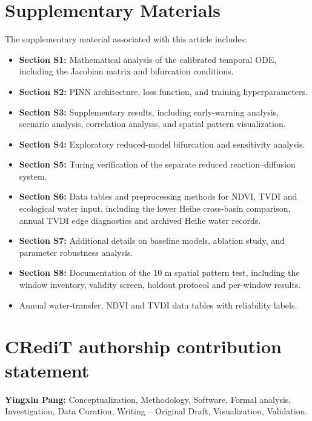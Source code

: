 \documentclass[preprint,review,12pt,3p]{elsarticle}
\begin{document}
	\section*{Supplementary Materials}
	
	The supplementary material associated with this article includes:
	\begin{itemize}
		\item \textbf{Section S1:} Mathematical analysis of the calibrated temporal
		ODE, including the Jacobian matrix and bifurcation conditions.
		
		\item \textbf{Section S2:} PINN architecture, loss function, and training
		hyperparameters.
		
		\item \textbf{Section S3:} Supplementary results, including early-warning
		analysis, scenario analysis, correlation analysis, and spatial pattern
		visualization.
		
		\item \textbf{Section S4:} Exploratory reduced-model bifurcation and
		sensitivity analysis.
		
		\item \textbf{Section S5:} Turing verification of the separate reduced
		reaction--diffusion system.
		
		\item \textbf{Section S6:} Data tables and preprocessing methods for NDVI,
		TVDI and ecological water input, including the lower Heihe cross-basin
		comparison, annual TVDI edge diagnostics and archived Heihe water records.
		\item \textbf{Section S7:} Additional details on baseline models, ablation study, and parameter robustness analysis.
	\item \textbf{Section S8:} Documentation of the 10 m spatial pattern test, including the window inventory, validity screen, holdout protocol and per-window results.
		\item Annual water-transfer, NDVI and TVDI data tables with reliability labels.
	\end{itemize}
	
	
	\section*{CRediT authorship contribution statement}
	\textbf{Yingxin Pang:} Conceptualization, Methodology, Software, Formal analysis, Investigation, Data Curation, Writing -- Original Draft, Visualization, Validation.
	
\end{document}
